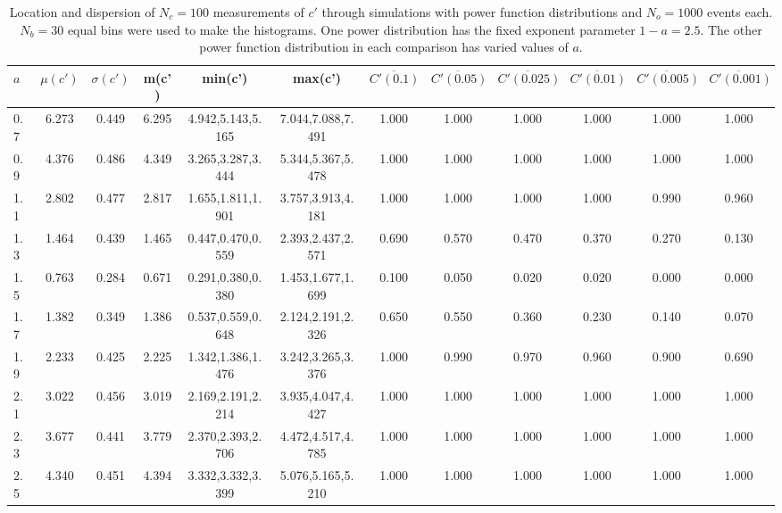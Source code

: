 \begin{table*}[h!]
\begin{center}
\begin{tabular}{| l | c | c | c | c | c | c | c | c | c | c | c |}\hline
$a$ & $\mu(c')$ & $\sigma(c')$ & m(c') & min(c') & max(c') & $\overline{C'(0.1)}$ & $\overline{C'(0.05)}$ & $\overline{C'(0.025)}$ & $\overline{C'(0.01)}$ & $\overline{C'(0.005)}$ & $\overline{C'(0.001)}$ \\\hline
0.7 & 6.273 & 0.449 & 6.295 & 4.942,5.143,5.165 & 7.044,7.088,7.491  & 1.000  & 1.000  & 1.000  & 1.000  & 1.000  & 1.000 \\\hline
0.9 & 4.376 & 0.486 & 4.349 & 3.265,3.287,3.444 & 5.344,5.367,5.478  & 1.000  & 1.000  & 1.000  & 1.000  & 1.000  & 1.000 \\\hline
1.1 & 2.802 & 0.477 & 2.817 & 1.655,1.811,1.901 & 3.757,3.913,4.181  & 1.000  & 1.000  & 1.000  & 1.000  & 0.990  & 0.960 \\\hline
1.3 & 1.464 & 0.439 & 1.465 & 0.447,0.470,0.559 & 2.393,2.437,2.571  & 0.690  & 0.570  & 0.470  & 0.370  & 0.270  & 0.130 \\\hline
1.5 & 0.763 & 0.284 & 0.671 & 0.291,0.380,0.380 & 1.453,1.677,1.699  & 0.100  & 0.050  & 0.020  & 0.020  & 0.000  & 0.000 \\\hline
1.7 & 1.382 & 0.349 & 1.386 & 0.537,0.559,0.648 & 2.124,2.191,2.326  & 0.650  & 0.550  & 0.360  & 0.230  & 0.140  & 0.070 \\\hline
1.9 & 2.233 & 0.425 & 2.225 & 1.342,1.386,1.476 & 3.242,3.265,3.376  & 1.000  & 0.990  & 0.970  & 0.960  & 0.900  & 0.690 \\\hline
2.1 & 3.022 & 0.456 & 3.019 & 2.169,2.191,2.214 & 3.935,4.047,4.427  & 1.000  & 1.000  & 1.000  & 1.000  & 1.000  & 1.000 \\\hline
2.3 & 3.677 & 0.441 & 3.779 & 2.370,2.393,2.706 & 4.472,4.517,4.785  & 1.000  & 1.000  & 1.000  & 1.000  & 1.000  & 1.000 \\\hline
2.5 & 4.340 & 0.451 & 4.394 & 3.332,3.332,3.399 & 5.076,5.165,5.210  & 1.000  & 1.000  & 1.000  & 1.000  & 1.000  & 1.000 \\\hline
\end{tabular}
\caption{Location and dispersion of $N_c=100$
measurements of $c'$ through simulations
with power function distributions and $N_o=1000$ events each.
$N_b=30$ equal bins were used to make the histograms.
One power distribution has the fixed exponent parameter $1-a=2.5$.
The other power function distribution in each comparison
has varied values of $a$.}
\end{center}
\end{table*}